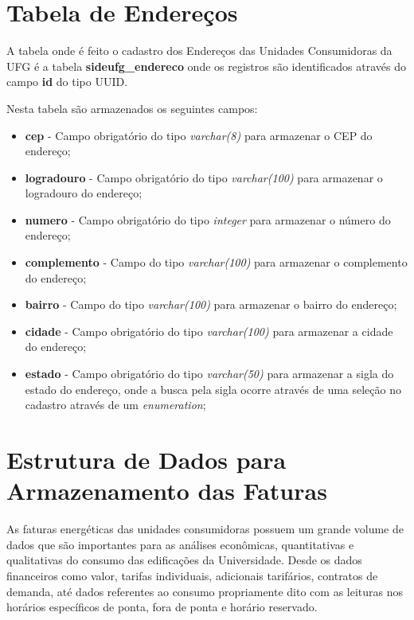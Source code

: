 \section{Tabela de Endereços}

A tabela onde é feito o cadastro dos Endereços das Unidades Consumidoras da UFG é a tabela \textbf{sideufg\_endereco} onde os registros são identificados através do campo \textbf{id} do tipo UUID.

Nesta tabela são armazenados os seguintes campos:

\begin{itemize}
    \item \textbf{cep} - Campo obrigatório do tipo \textit{varchar(8)} para armazenar o CEP do endereço;
    \item \textbf{logradouro} - Campo obrigatório do tipo \textit{varchar(100)} para armazenar o logradouro do endereço;
    \item \textbf{numero} - Campo obrigatório do tipo \textit{integer} para armazenar o número do endereço;
    \item \textbf{complemento} - Campo do tipo \textit{varchar(100)} para armazenar o complemento do endereço;
    \item \textbf{bairro} - Campo do tipo \textit{varchar(100)} para armazenar o bairro do endereço;
    \item \textbf{cidade} - Campo obrigatório do tipo \textit{varchar(100)} para armazenar a cidade do endereço;
    \item \textbf{estado} - Campo obrigatório do tipo \textit{varchar(50)} para armazenar a sigla do estado do endereço, onde a busca pela sigla ocorre através de uma seleção no cadastro através de um \textit{enumeration};
    
\end{itemize}

\section{Estrutura de Dados para Armazenamento das Faturas}

As faturas energéticas das unidades consumidoras possuem um grande volume de dados que são importantes para as análises econômicas, quantitativas e qualitativas do consumo das edificações da Universidade. Desde os dados financeiros como valor, tarifas individuais, adicionais tarifários, contratos de demanda, até dados referentes ao consumo propriamente dito com as leituras nos horários específicos de ponta, fora de ponta e horário reservado.

